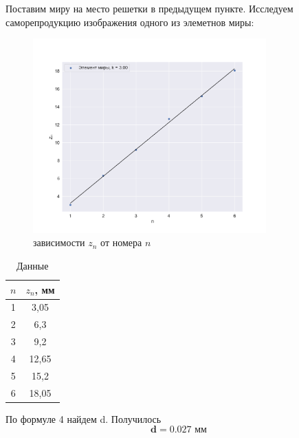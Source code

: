 \documentclass[a4paper, 12pt]{article}
\begin{document}
Поставим миру на место решетки в предыдущем пункте. Исследуем саморепродукцию изображения одного из элеметнов миры:


\begin{figure}[H]
	\centering
	\includegraphics[width=0.8\textwidth]{plot2.png}
	\caption{зависимости $z_n$ от номера $n$}
	\label{fig:plo2}
\end{figure}

\begin{table}[H]
	\centering
	\begin{tabular}{|c|c|}
	\hline
	\textbf{$n$} & \textbf{$z_n$, мм} \\ \hline
	1              & 3,05           \\ \hline
	2              & 6,3            \\ \hline
	3              & 9,2            \\ \hline
	4              & 12,65          \\ \hline
	5              & 15,2           \\ \hline
	6              & 18,05          \\ \hline
	\end{tabular}
	\caption{Данные}
	\label{tab:datamir}
	\end{table}

По формуле 4 найдем d. Получилось
\begin{equation}
	\mathbf{d = 0.027 \text{ мм}}
\end{equation}
\end{document}
